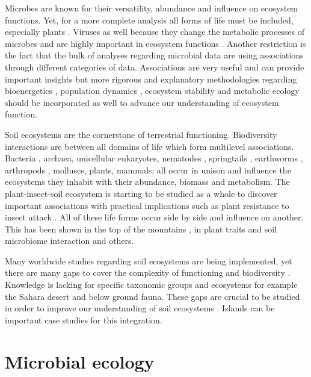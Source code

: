 Microbes are known for their versatility, abundance and influence on ecosystem
functions. Yet, for a more complete analysis all forms of life must be included,
especially plants \parencite{thompson2012Food}. Viruses as well because they
change the metabolic processes of microbes and are highly important in
ecosystem functions \parencite{hurwitz2016Viral}. Another restriction is the fact
that the bulk of analyses regarding microbial data are using associations
through different categories of data. Associations are very useful and can
provide important insights but more rigorous and explanatory methodologies
regarding bioenergetics \parencite{kempes2012Growth}, population dynamics
\parencite{gonze2018Microbial}, ecosystem stability \parencite{berdugo2020Global} and
metabolic ecology \parencite{brown2004METABOLIC} should be incorporated as well to
advance our understanding of ecosystem function.

Soil ecosystems are the cornerstone of terrestrial functioning.
Biodiversity interactions are between all domains of life which form
multilevel associations. Bacteria \parencite{Delgado-Baquerizo-atlas}, archaea,
unicellular eukaryotes, nematodes \parencite{vandenHoogen2019},
springtails \parencite{potapov2023Globally}, earthworms \parencite{Phillips2021},
arthropods \parencite{milo-arthropods}, molluscs, plants, mammals; all occur in unison and 
influence the ecosystems they inhabit with their abundance, biomass \parencite{bar2018biomass} and metabolism.
The plant-insect-soil ecosystem is starting to be studied as a whole to discover
important associations with practical implications such as plant resistance 
to insect attack \parencite{plant-insect-soil2023}.
All of these life forms occur side by side and influence on another. This has been shown in the 
top of the mountains \parencite{winkler2018side}, in plant traits and soil microbiome interaction \parencite{beugnon2022Abiotic} and others. 

Many worldwide studies regarding soil ecosystems are being implemented, yet
there are many gaps to cover the complexity of functioning and biodiversity
\parencite{guerra2020Blind}. Knowledge is lacking for specific taxonomic groups and
ecosystems for example the Sahara desert and below ground fauna.
These gaps are crucial to be studied in order to
improve our understanding of soil ecosystems \parencite{cameron2018Global}. 
Islands can be important case studies for this integration.

\section{Microbial ecology}
\label{sec:microbial_ecology}

